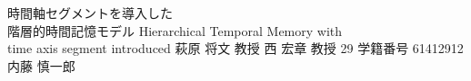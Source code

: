 \documentclass[final,a4j,12pt]{jreport}
\begin{document}
\begin{titlepage}
\thesis
{時間軸セグメントを導入した \\ 階層的時間記憶モデル}
{Hierarchical Temporal Memory with \\ time axis segment introduced}
{萩原 将文 教授}
{西 宏章 教授}
{29}
{学籍番号 61412912}
{内藤 慎一郎}
\end{titlepage}

\contents



% 
% 
% 
% 
% 
% 
% 

% 
% 
% 


% 
% 
% 
\end{document}
